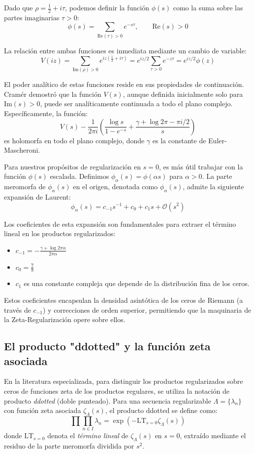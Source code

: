 Dado que $\rho = \frac{1}{2} + i\tau$, podemos definir la función $\phi(s)$ como la suma sobre las partes imaginarias $\tau > 0$:
$$ \phi(s) = \sum_{\text{Re}(\tau)>0} e^{-s\tau}, \qquad \text{Re}(s) > 0 $$

La relación entre ambas funciones es inmediata mediante un cambio de variable:
$$ V(iz) = \sum_{\text{Im}(\rho)>0} e^{iz(\frac{1}{2} + i\tau)} = e^{iz/2} \sum_{\tau>0} e^{-z\tau} = e^{iz/2} \phi(z) $$

El poder analítico de estas funciones reside en sus propiedades de continuación. Cramér demostró que la función $V(s)$, aunque definida inicialmente solo para $\text{Im}(s) > 0$, puede ser analíticamente continuada a todo el plano complejo. Específicamente, la función:
$$ V(s) - \frac{1}{2\pi i} \left( \frac{\log s}{1 - e^{-s}} + \frac{\gamma + \log 2\pi - \pi i/2}{s} \right) $$
es holomorfa en todo el plano complejo, donde $\gamma$ es la constante de Euler-Mascheroni. 

Para nuestros propósitos de regularización en $s=0$, es más útil trabajar con la función $\phi(s)$ escalada. Definimos $\phi_\alpha(s) = \phi(\alpha s)$ para $\alpha > 0$. La parte meromorfa de $\phi_\alpha(s)$ en el origen, denotada como $\phi_\alpha(s)$, admite la siguiente expansión de Laurent:
$$ \phi_\alpha(s) = c_{-1}s^{-1} + c_0 + c_1 s + \mathcal{O}(s^2) $$

Los coeficientes de esta expansión son fundamentales para extraer el término lineal en los productos regularizados:
\begin{itemize}
    \item $c_{-1} = -\frac{\gamma + \log 2\pi\alpha}{2\pi\alpha}$
    \item $c_0 = \frac{7}{8}$
    \item $c_1$ es una constante compleja que depende de la distribución fina de los ceros.
\end{itemize}

Estos coeficientes encapsulan la densidad asintótica de los ceros de Riemann (a través de $c_{-1}$) y correcciones de orden superior, permitiendo que la maquinaria de la Zeta-Regularización opere sobre ellos.

\subsection{El producto "ddotted" y la función zeta asociada}

En la literatura especializada, para distinguir los productos regularizados sobre ceros de funciones zeta de los productos regulares, se utiliza la notación de producto \textit{ddotted} (doble punteado). Para una secuencia regularizable $\Lambda = \{\lambda_n\}$ con función zeta asociada $\zeta_\Lambda(s)$, el producto ddotted se define como:
$$ \prod\prod_{n \in I} \lambda_n = \exp\left( -\text{LT}_{s=0} \zeta_\Lambda(s) \right) $$
donde $\text{LT}_{s=0}$ denota el \textit{término lineal} de $\zeta_\Lambda(s)$ en $s=0$, extraído mediante el residuo de la parte meromorfa dividida por $s^2$.

